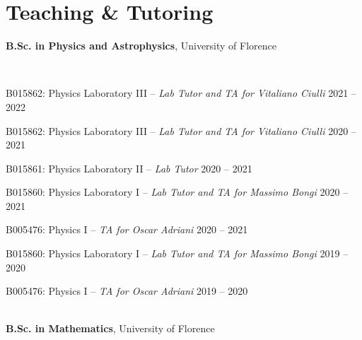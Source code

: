 \newcommand{\teaching}[2]
  {\normalsize
    \textbf{\color{hlcolor-0} #1}, {\color{hlcolor-1} #2}
  }


\section*{Teaching \& Tutoring}
\begin{cvcontent}
  \teaching{B.Sc. in Physics and Astrophysics}{University of Florence}
  \\ [0.5mm]
  \begin{itemize*}[label=\textcolor{iconcolor}{\textbullet}]
    \item B015862: Physics Laboratory III -- \emph{\small Lab Tutor and TA for Vitaliano Ciulli} \hfill {\normalsize \color{hlcolor-2} 2021 -- 2022}\\ [0.5mm]
    \item B015862: Physics Laboratory III -- \emph{\small Lab Tutor and TA for Vitaliano Ciulli} \hfill {\normalsize \color{hlcolor-2} 2020 -- 2021}\\ [0.5mm]
    \item B015861: Physics Laboratory II -- \emph{\small Lab Tutor} \hfill {\normalsize \color{hlcolor-2} 2020 -- 2021}\\ [0.5mm]
    \item B015860: Physics Laboratory I -- \emph{\small Lab Tutor and TA for Massimo Bongi} \hfill {\normalsize \color{hlcolor-2} 2020 -- 2021}\\ [0.5mm]
    \item B005476: Physics I -- \emph{\small TA for Oscar Adriani} \hfill {\normalsize \color{hlcolor-2} 2020 -- 2021}\\ [0.5mm]
    \item B015860: Physics Laboratory I -- \emph{\small Lab Tutor and TA for Massimo Bongi} \hfill {\normalsize \color{hlcolor-2} 2019 -- 2020}\\ [0.5mm]
    \item B005476: Physics I -- \emph{\small TA for Oscar Adriani} \hfill {\normalsize \color{hlcolor-2} 2019 -- 2020}
  \end{itemize*}
  \\ [2.5mm]
  \teaching{B.Sc. in Mathematics}{University of Florence}
  \\ [0.5mm]
  \begin{itemize*}[label=\textcolor{iconcolor}{\textbullet}]

\end{itemize*}
\end{cvcontent}
